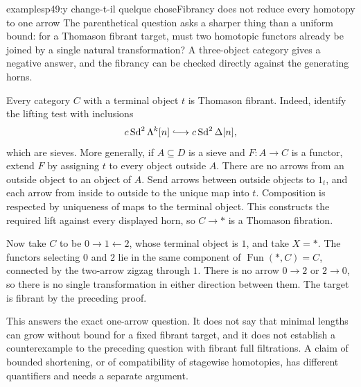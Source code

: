 \begin{dcomment}{examples}{p49:y change-t-il quelque chose}{Fibrancy does not reduce every homotopy to one arrow}
The parenthetical question asks a sharper thing than a uniform bound: for a Thomason fibrant target, must two homotopic functors already be joined by a single natural transformation? A three-object category gives a negative answer, and the fibrancy can be checked directly against the generating horns.

Every category $C$ with a terminal object $t$ is Thomason fibrant. Indeed, \citet[Propositions~2.5 and 4.2]{Thomason1980} identify the lifting test with inclusions
\[
 c\operatorname{Sd}^2\Lambda^k[n]
     \lhook\joinrel\longrightarrow c\operatorname{Sd}^2\Delta[n],
\]
which are sieves. More generally, if $A\subseteq D$ is a sieve and $F:A\to C$ is a functor, extend $F$ by assigning $t$ to every object outside $A$. There are no arrows from an outside object to an object of $A$. Send arrows between outside objects to $1_t$, and each arrow from inside to outside to the unique map into $t$. Composition is respected by uniqueness of maps to the terminal object. This constructs the required lift against every displayed horn, so $C\to *$ is a Thomason fibration.

Now take $C$ to be $0\to1\leftarrow2$, whose terminal object is $1$, and take $X=*$. The functors selecting $0$ and $2$ lie in the same component of $\operatorname{Fun}(*,C)=C$, connected by the two-arrow zigzag through $1$. There is no arrow $0\to2$ or $2\to0$, so there is no single transformation in either direction between them. The target is fibrant by the preceding proof.

This answers the exact one-arrow question. It does not say that minimal lengths can grow without bound for a fixed fibrant target, and it does not establish a counterexample to the preceding question with fibrant full filtrations. A claim of bounded shortening, or of compatibility of stagewise homotopies, has different quantifiers and needs a separate argument.
\end{dcomment}

